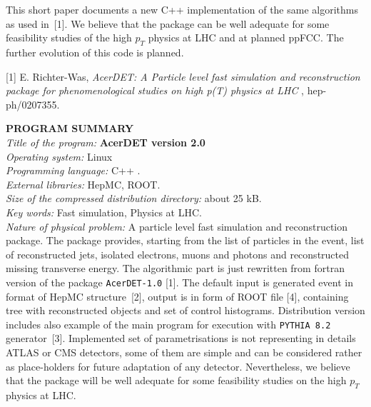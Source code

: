 \begin{titlepage}
This short paper documents a new C++ implementation of the same algorithms 
as used in~[1]. We believe that the package can be well adequate 
for some feasibility studies of the high $p_T$ physics at LHC and at planned ppFCC. 
The further evolution of this code is planned.

\vspace{1.5cm}
[1]  E. Richter-Was, {\it AcerDET: A Particle level fast simulation and reconstruction 
package for phenomenological studies on high p(T) physics at LHC },
hep-ph/0207355.



\newpage
\boldmath
{\bf \Large PROGRAM SUMMARY}
\unboldmath
\vspace{1.0cm}
\\
{\it Title of the program:} {\bf AcerDET version 2.0}\\
{\it Operating system:} Linux\\
{\it Programming language:} C++ .\\
{\it External libraries:} HepMC, ROOT.\\
{\it Size of the compressed distribution directory:} about 25 kB.\\ 
{\it Key words:} Fast simulation, Physics at LHC.\\ 
{\it Nature of physical problem:} A particle level fast simulation and
reconstruction package. The package provides, starting
from the list of particles in the event, list of reconstructed
jets, isolated electrons, muons and photons and
reconstructed missing transverse energy. The algorithmic part is just
rewritten from fortran version of the package {\tt AcerDET-1.0} [1].
The default input is generated event in format of HepMC structure~[2],
output is in form of ROOT file [4], containing tree with reconstructed objects
and set of control histograms. 
Distribution version includes also example of the
main program for execution with {\tt PYTHIA 8.2} generator~[3].
Implemented set of parametrisations is not representing in details ATLAS or
CMS detectors, some of them are simple and can be considered
rather as place-holders for future adaptation of any detector. 
Nevertheless, we believe that the package will be well adequate for some
feasibility studies on the high $p_T$ physics at LHC.

\vspace{0.5cm}  
  

\end{titlepage}
